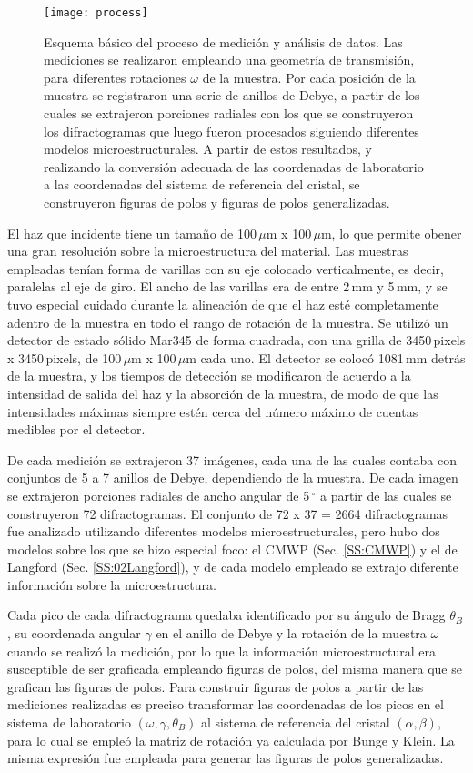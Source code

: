 \begin{figure}[!htb]
  \centering
  \texttt{[image: process]}
  \caption{Esquema básico del proceso de medición y análisis de datos. Las mediciones se realizaron empleando una geometría de transmisión, para diferentes rotaciones $\omega$ de la muestra. Por cada posición de la muestra se registraron una serie de anillos de Debye, a partir de los cuales se extrajeron porciones radiales con los que se construyeron los difractogramas que luego fueron procesados siguiendo diferentes modelos microestructurales. A partir de estos resultados, y realizando la conversión adecuada de las coordenadas de laboratorio a las coordenadas del sistema de referencia del cristal, se construyeron figuras de polos y figuras de polos generalizadas.}
  \label{fig:transmision}
\end{figure}

El haz que incidente tiene un tamaño de 100\,$\mu$m x 100\,$\mu$m, lo que permite obener una gran resolución sobre la microestructura del material.
Las muestras empleadas tenían forma de varillas con su eje colocado verticalmente, es decir, paralelas al eje de giro.
El ancho de las varillas era de entre 2\,mm y 5\,mm, y se tuvo especial cuidado durante la alineación de que el haz esté completamente adentro de la muestra en todo el rango de rotación de la muestra.
Se utilizó un detector de estado sólido Mar345 de forma cuadrada, con una grilla de 3450\,pixels x 3450\,pixels, de 100\,$\mu$m x 100\,$\mu$m cada uno.
El detector se colocó 1081\,mm detrás de la muestra, y los tiempos de detección se modificaron de acuerdo a la intensidad de salida del haz y la absorción de la muestra, de modo de que las intensidades máximas siempre estén cerca del número máximo de cuentas medibles por el detector.

De cada medición se extrajeron 37 imágenes, cada una de las cuales contaba con conjuntos de 5 a 7 anillos de Debye, dependiendo de la muestra.
De cada imagen se extrajeron porciones radiales de ancho angular de 5\,$^{\circ}$ a partir de las cuales se construyeron 72 difractogramas.
El conjunto de 72 x 37 = 2664 difractogramas fue analizado utilizando diferentes modelos microestructurales, pero hubo dos modelos sobre los que se hizo especial foco: el CMWP (Sec. \ref{SS:CMWP}) y el de Langford (Sec. \ref{SS:02Langford}), y de cada modelo empleado se extrajo diferente información sobre la microestructura.

Cada pico de cada difractograma quedaba identificado por su ángulo de Bragg $\theta_B$, su coordenada angular $\gamma$ en el anillo de Debye y la rotación de la muestra $\omega$ cuando se realizó la medición, por lo que la información microestructural era susceptible de ser graficada empleando figuras de polos, del misma manera que se grafican las figuras de polos.
Para construir figuras de polos a partir de las mediciones realizadas es preciso transformar las coordenadas de los picos en el sistema de laboratorio $(\omega, \gamma, \theta_B)$ al sistema de referencia del cristal $(\alpha, \beta)$, para lo cual se empleó la matriz de rotación ya calculada por Bunge y Klein\cite{Bunge1996}.
La misma expresión fue empleada para generar las figuras de polos generalizadas.

